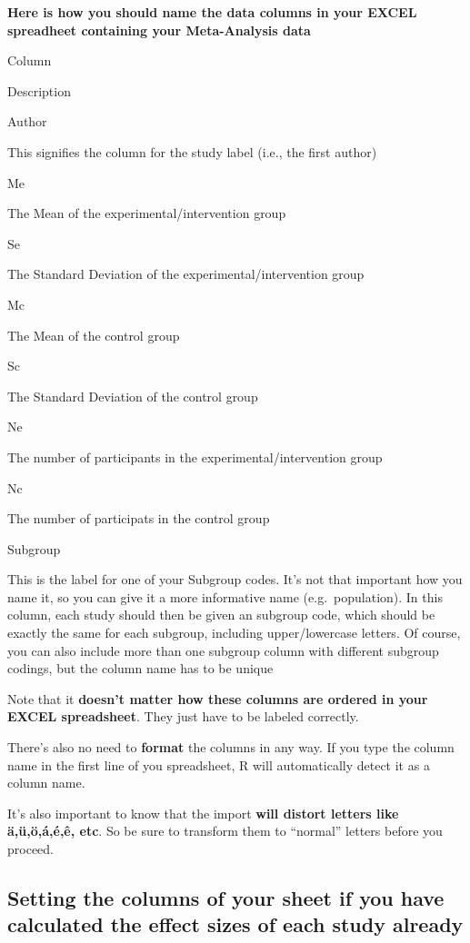 \documentclass[]{book}
\begin{document}
\textbf{Here is how you should name the data columns in your EXCEL spreadheet containing your Meta-Analysis data}

Column

Description

Author

This signifies the column for the study label (i.e., the first author)

Me

The Mean of the experimental/intervention group

Se

The Standard Deviation of the experimental/intervention group

Mc

The Mean of the control group

Sc

The Standard Deviation of the control group

Ne

The number of participants in the experimental/intervention group

Nc

The number of participats in the control group

Subgroup

This is the label for one of your Subgroup codes. It's not that important how you name it, so you can give it a more informative name (e.g.~population). In this column, each study should then be given an subgroup code, which should be exactly the same for each subgroup, including upper/lowercase letters. Of course, you can also include more than one subgroup column with different subgroup codings, but the column name has to be unique

Note that it \textbf{doesn't matter how these columns are ordered in your EXCEL spreadsheet}. They just have to be labeled correctly.

There's also no need to \textbf{format} the columns in any way. If you type the column name in the first line of you spreadsheet, R will automatically detect it as a column name.

\begin{rmdachtung}
It's also important to know that the import \textbf{will distort letters
like ä,ü,ö,á,é,ê, etc}. So be sure to transform them to ``normal''
letters before you proceed.
\end{rmdachtung}

\hypertarget{setting-the-columns-of-your-sheet-if-you-have-calculated-the-effect-sizes-of-each-study-already}{%
\subsection{Setting the columns of your sheet if you have calculated the effect sizes of each study already}\label{setting-the-columns-of-your-sheet-if-you-have-calculated-the-effect-sizes-of-each-study-already}}
\end{document}
